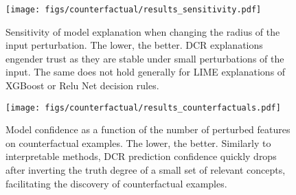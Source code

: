 \begin{figure}[t]
    \centering
    \texttt{[image: figs/counterfactual/results\_sensitivity.pdf]}
    \caption{Sensitivity of model explanation when changing the radius of the input perturbation. The lower, the better. DCR explanations engender trust as they are stable under small perturbations of the input. The same does not hold generally for LIME explanations of XGBoost or Relu Net decision rules.}
    \label{fig:sensitivity}
\end{figure}

\begin{figure}[t]
    \centering
    \texttt{[image: figs/counterfactual/results\_counterfactuals.pdf]}
    \caption{Model confidence as a function of the number of perturbed features on counterfactual examples. The lower, the better. Similarly to interpretable methods, DCR prediction confidence quickly drops after inverting the truth degree of a small set of relevant concepts, facilitating the discovery of counterfactual examples. }
    \label{fig:counterfactuals}
\end{figure}


